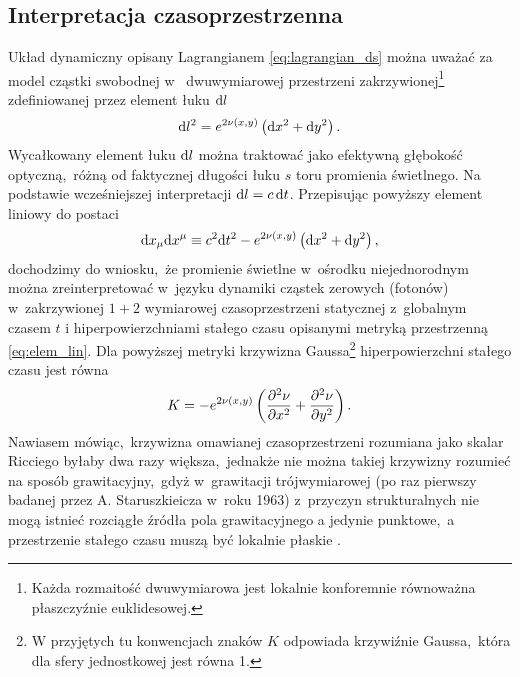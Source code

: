 \subsection{Interpretacja czasoprzestrzenna}
\indent Układ dynamiczny opisany Lagrangianem \eqref{eq:lagrangian_ds} można uważać za model cząstki swobodnej w~ dwuwymiarowej przestrzeni zakrzywionej\footnote{Każda rozmaitość dwuwymiarowa jest lokalnie konforemnie równoważna płaszczyźnie euklidesowej.} zdefiniowanej przez element łuku ${\rm d}{l}$
\begin{equation}\label{eq:elem_lin}{\rm d}{l}^2=e^{2\nu(x,y)}\left({{\rm d}{x}^2+{\rm d}{y}^2}\right).\end{equation} Wycałkowany element łuku ${\rm d}{l}$ można traktować jako efektywną głębokość optyczną,~różną od faktycznej długości łuku $s$ toru promienia świetlnego. 
Na podstawie wcześniejszej interpretacji ${\rm d}{l}=c\,{\rm d}{t}$. Przepisując powyższy element liniowy do postaci
$${\rm d}{x}_{\mu}{\rm d}{x}^{\mu}\equiv c^2{\rm d}{t}^2-e^{2\nu(x,y)}\left({{\rm d}{x}^2+{\rm d}{y}^2}\right),$$ dochodzimy do wniosku,~że promienie świetlne w~ośrodku niejednorodnym można zreinterpretować w~języku dynamiki cząstek zerowych (fotonów) w~zakrzywionej $1{+}2$ wymiarowej czasoprzestrzeni statycznej z~globalnym czasem $t$ i hiperpowierzchniami stałego czasu opisanymi metryką przestrzenną \eqref{eq:elem_lin}. Dla powyższej metryki krzywizna  Gaussa\footnote{W przyjętych tu konwencjach znaków $K$ odpowiada krzywiźnie Gaussa,~która dla sfery jednostkowej jest równa 1.} hiperpowierzchni stałego czasu jest równa
 $$K=-e^{2\nu(x,y)}\left({\frac{\partial^2\nu}{\partial{x}^2}+\frac{\partial^2\nu}{\partial{y}^2}}\right).$$ Nawiasem mówiąc,~krzywizna omawianej czasoprzestrzeni rozumiana jako skalar Ricciego byłaby dwa razy większa,~jednakże nie można takiej krzywizny rozumieć na sposób grawitacyjny,~gdyż w~grawitacji trójwymiarowej (po raz pierwszy badanej przez A. Staruszkieicza w~roku 1963) z~przyczyn strukturalnych nie mogą istnieć rozciągłe źródła pola grawitacyjnego a jedynie pun\-kto\-we,~a przestrzenie stałego czasu muszą być lokalnie płaskie \cite{AStar1963}. 
 

